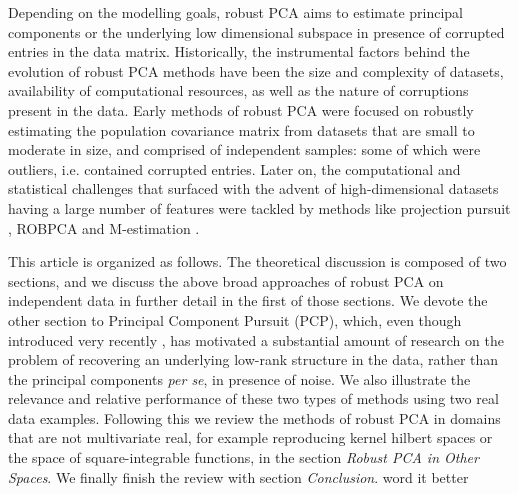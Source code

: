 Depending on the modelling goals, robust PCA aims to estimate principal components or the underlying low dimensional subspace in presence of corrupted entries in the data matrix. Historically, the instrumental factors behind the evolution of robust PCA methods have been the size and complexity of datasets, availability of computational resources, as well as the nature of corruptions present in the data. Early methods of robust PCA were focused on robustly estimating the population covariance matrix from datasets that are small to moderate in size, and comprised of independent samples: some of which were outliers, i.e. contained corrupted entries. Later on, the computational and statistical challenges that surfaced with the advent of high-dimensional datasets having a large number of features were tackled by methods like projection pursuit \citep{LiChen85}, ROBPCA \citep{hubert05} and M-estimation \citep{LocantoreEtal99,Majumdar15}.

This article is organized as follows. The theoretical discussion is composed of two sections, and we discuss the above broad approaches of robust PCA on independent data in further detail in the first of those sections. We devote the other section to Principal Component Pursuit (PCP), which, even though introduced very recently \citep{CandesEtal09}, has motivated a substantial amount of research on the problem of recovering an underlying low-rank structure in the data, rather than the principal components \textit{per se}, in presence of noise. We also illustrate the relevance and relative performance of these two types of methods using two real data examples. Following this we review the methods of robust PCA in domains that are not multivariate real, for example reproducing kernel hilbert spaces or the space of square-integrable functions, in the section {\it Robust PCA in Other Spaces}. We finally finish the review with section {\it Conclusion}. {\colrbf word it better}
